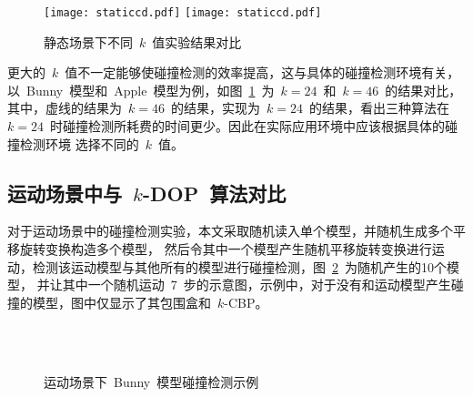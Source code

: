 \begin{figure}[htb] 
\centering
{}
{  
   \texttt{[image: staticcd.pdf]}
}
{  
    \texttt{[image: staticcd.pdf]}
}
\caption{静态场景下不同~$k$~值实验结果对比}
\label{fig:chart:exp:kdop:kcbp:k24:k46}
\end{figure}

更大的~$k$~值不一定能够使碰撞检测的效率提高，这与具体的碰撞检测环境有关，以~Bunny~模型和~Apple~模型为例，如图~\ref{fig:chart:exp:kdop:kcbp:k24:k46}~为~$k=24$~和~$k=46$~的结果对比，
其中，虚线的结果为~$k=46$~的结果，实现为~$k=24$~的结果，看出三种算法在~$k=24$~时碰撞检测所耗费的时间更少。因此在实际应用环境中应该根据具体的碰撞检测环境
选择不同的~$k$~值。

\subsection{运动场景中与~$k$-DOP~算法对比}
\label{subsec:exper:kdop:kcbp:dynamic}

对于运动场景中的碰撞检测实验，本文采取随机读入单个模型，并随机生成多个平移旋转变换构造多个模型，
然后令其中一个模型产生随机平移旋转变换进行运动，检测该运动模型与其他所有的模型进行碰撞检测，图~\ref{fig:dynamic:cd:bunny}~为随机产生的10个模型，
并让其中一个随机运动~7~步的示意图，示例中，对于没有和运动模型产生碰撞的模型，图中仅显示了其包围盒和~$k$-CBP。

\begin{figure}[htb]
\centering
{} 
\\ 
\\
\caption{运动场景下~Bunny~模型碰撞检测示例}
\label{fig:dynamic:cd:bunny}
\end{figure}

